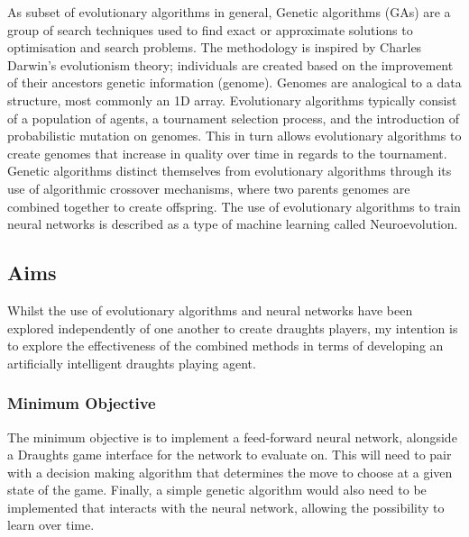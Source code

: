 \documentclass[12pt,a4paper]{article}
\begin{document}
    As subset of evolutionary algorithms in general, Genetic algorithms (GAs) are a group of search techniques used to find exact or approximate solutions to optimisation and search problems. The methodology is inspired by Charles Darwin's evolutionism theory; individuals are created based on the improvement of their ancestors genetic information (genome). Genomes are analogical to a data structure, most commonly an 1D array. Evolutionary algorithms typically consist of a population of agents, a tournament selection process, and the introduction of probabilistic mutation on genomes. This in turn allows evolutionary algorithms to create genomes that increase in quality over time in regards to the tournament. Genetic algorithms distinct themselves from evolutionary algorithms through its use of algorithmic crossover mechanisms, where two parents genomes are combined together to create offspring. The use of evolutionary algorithms to train neural networks is described as a type of machine learning called Neuroevolution.

    \subsection{Aims}

    Whilst the use of evolutionary algorithms and neural networks have been explored independently of one another to create draughts players, my intention is to explore the effectiveness of the combined methods in terms of developing an artificially intelligent draughts playing agent. 

    \subsubsection{Minimum Objective}
        The minimum objective is to implement a feed-forward neural network, alongside a Draughts game interface for the network to evaluate on. This will need to pair with a decision making algorithm that determines the move to choose at a given state of the game. Finally, a simple genetic algorithm would also need to be implemented that interacts with the neural network, allowing the possibility to learn over time.
\end{document}
